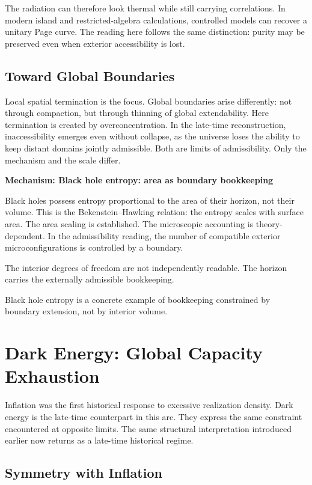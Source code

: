 \documentclass[11pt,twoside,openright]{book}
\newenvironment{mechanismbox}[1]
  {\begin{framed}\noindent\textbf{Mechanism: #1}\par\medskip}
  {\end{framed}}
\begin{document}
The radiation can therefore look thermal while still carrying correlations. In modern island and restricted-algebra calculations, controlled models can recover a unitary Page curve. The reading here follows the same distinction: purity may be preserved even when exterior accessibility is lost.

\section*{Toward Global Boundaries}

Local spatial termination is the focus. Global boundaries arise differently: not through compaction, but through thinning of global extendability. Here termination is created by overconcentration. In the late-time reconstruction, inaccessibility emerges even without collapse, as the universe loses the ability to keep distant domains jointly admissible. Both are limits of admissibility. Only the mechanism and the scale differ.

\begin{mechanismbox}{Black hole entropy: area as boundary bookkeeping}

Black holes possess entropy proportional to the area of their horizon, not their volume. This is the Bekenstein--Hawking relation: the entropy scales with surface area. The area scaling is established. The microscopic accounting is theory-dependent. In the admissibility reading, the number of compatible exterior microconfigurations is controlled by a boundary.

The interior degrees of freedom are not independently readable. The horizon carries the externally admissible bookkeeping.

Black hole entropy is a concrete example of
bookkeeping constrained by boundary extension,
not by interior volume.
\end{mechanismbox}

\chapter{Dark Energy: Global Capacity Exhaustion}

Inflation was the first historical response to excessive realization density. Dark energy is the late-time counterpart in this arc. They express the same constraint encountered at opposite limits. The same structural interpretation introduced earlier now returns as a late-time historical regime.

\section*{Symmetry with Inflation}
\end{document}
